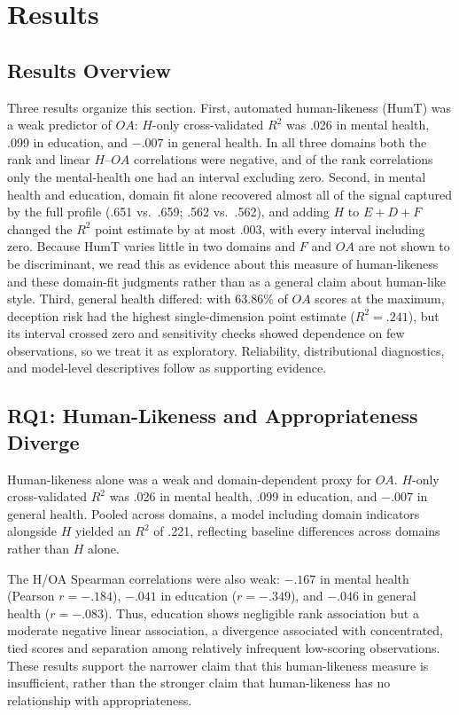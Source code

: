 \documentclass[manuscript,review,anonymous]{acmart}
\begin{document}
\section{Results}

\subsection{Results Overview}

Three results organize this section. First, automated human-likeness (HumT) was a weak predictor of $OA$: $H$-only cross-validated $R^2$ was .026 in mental health, .099 in education, and $-.007$ in general health. In all three domains both the rank and linear $H$--$OA$ correlations were negative, and of the rank correlations only the mental-health one had an interval excluding zero. Second, in mental health and education, domain fit alone recovered almost all of the signal captured by the full profile (.651 vs.\ .659; .562 vs.\ .562), and adding $H$ to $E+D+F$ changed the $R^2$ point estimate by at most .003, with every interval including zero. Because HumT varies little in two domains and $F$ and $OA$ are not shown to be discriminant, we read this as evidence about this measure of human-likeness and these domain-fit judgments rather than as a general claim about human-like style. Third, general health differed: with 63.86\% of $OA$ scores at the maximum, deception risk had the highest single-dimension point estimate ($R^2=.241$), but its interval crossed zero and sensitivity checks showed dependence on few observations, so we treat it as exploratory. Reliability, distributional diagnostics, and model-level descriptives follow as supporting evidence.

\subsection{RQ1: Human-Likeness and Appropriateness Diverge}

Human-likeness alone was a weak and domain-dependent proxy for $OA$. $H$-only cross-validated $R^2$ was .026 in mental health, .099 in education, and $-.007$ in general health. Pooled across domains, a model including domain indicators alongside $H$ yielded an $R^2$ of .221, reflecting baseline differences across domains rather than $H$ alone.

The H/OA Spearman correlations were also weak: $-.167$ in mental health (Pearson $r=-.184$), $-.041$ in education ($r=-.349$), and $-.046$ in general health ($r=-.083$). Thus, education shows negligible rank association but a moderate negative linear association, a divergence associated with concentrated, tied scores and separation among relatively infrequent low-scoring observations. These results support the narrower claim that this human-likeness measure is insufficient, rather than the stronger claim that human-likeness has no relationship with appropriateness.
\end{document}
